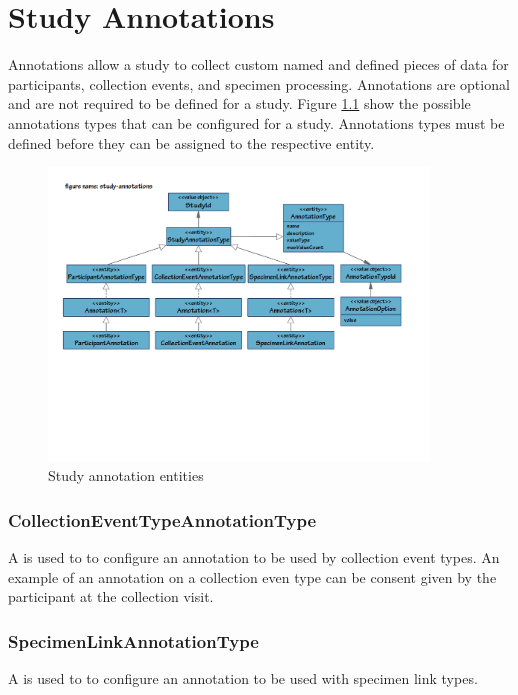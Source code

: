 \chapter{Study Annotations}
\label{chap:study-annotations}
Annotations allow a study to collect custom named and defined pieces of data
for participants, collection events, and specimen processing.  Annotations are
optional and are not required to be defined for a study. Figure
\ref{fig:study-annotations} show the possible annotations types that can be
configured for a study. Annotations types must be defined before they can be
assigned to the respective entity.

\begin{figure}[H]
  \centering
  \includegraphics[trim={9mm 82mm 20mm 18mm}, clip,
    width=0.9\textwidth]{images/study-annotations}
  \caption{Study annotation entities}
  \label{fig:study-annotations}
\end{figure}

\subsection*{CollectionEventTypeAnnotationType}
A  is used to to configure an
annotation to be used by collection event types. An example of an annotation on
a collection even type can be consent given by the participant at the
collection visit.

\subsection*{SpecimenLinkAnnotationType}
A  is used to to configure an
annotation to be used with specimen link types.

